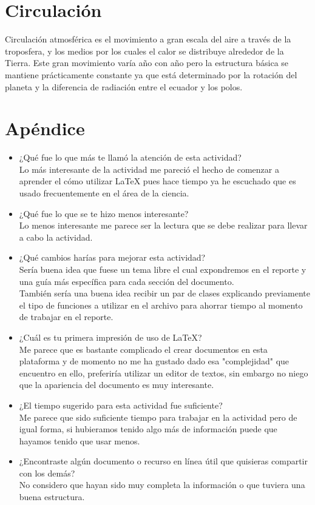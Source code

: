 \section{Circulación}
Circulación atmosférica es el movimiento a gran escala del aire a
través de la troposfera, y los medios por los cuales el calor se
distribuye alrededor de la Tierra. Este gran movimiento varía año
con año pero la estructura básica se mantiene prácticamente constante
ya que está determinado por la rotación del planeta y la diferencia
de radiación entre el ecuador y los polos.

\setlength\parindent{24pt}

\section{Apéndice}
\begin{itemize}
\item
¿Qué fue lo que más te llamó la atención de esta actividad?
\\[3mm] Lo más interesante de la actividad me pareció el hecho
de comenzar a aprender el cómo utilizar \LaTeX{} pues hace tiempo ya he
escuchado que es usado frecuentemente en el área de la ciencia.

\item
¿Qué fue lo que se te hizo menos interesante?
\\[3mm] Lo menos interesante me parece ser la lectura que se debe
realizar para llevar a cabo la actividad.

\item
¿Qué cambios harías para mejorar esta actividad?
\\[3mm] Sería buena idea que fuese un tema libre el cual expondremos en el
reporte y una guía más específica para cada sección del documento.
\\[3mm] También sería una buena idea recibir un par de clases explicando
previamente el tipo de funciones a utilizar en el archivo para ahorrar
tiempo al momento de trabajar en el reporte.

\item ¿Cuál es tu primera impresión de uso de \LaTeX?
\\[3mm] Me parece que es bastante complicado el crear documentos en esta
plataforma y de momento no me ha gustado dado esa "complejidad" que
encuentro en ello, preferiría utilizar un editor de textos, sin embargo no
niego que la apariencia del documento es muy interesante.

\item ¿El tiempo sugerido para esta actividad fue suficiente?
\\[3mm] Me parece que sido suficiente tiempo para trabajar en la actividad
pero de igual forma, si hubieramos tenido algo más de información puede
que hayamos tenido que usar menos.

\item ¿Encontraste algún documento o recurso en línea útil que quisieras compartir con los demás?
\\[3mm] No considero que hayan sido muy completa la información o que tuviera una buena estructura.
\end{itemize}

